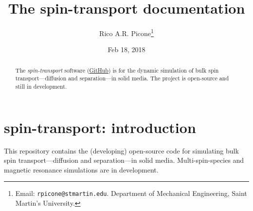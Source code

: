 \documentclass[%
oneside,                 %
final,                   %
10pt]{article}
\let\oldtoc\tableofcontents
\renewcommand{\tableofcontents}{{\sffamily\oldtoc}}
\begin{document}

\newcommand{\exercisesection}[1]{\subsection*{#1}}







\title{\sffamily\bfseries{}The spin-transport documentation}


\author{\sffamily{}Rico A.R. Picone\footnote{Email: \texttt{rpicone@stmartin.edu}. Department of Mechanical Engineering, Saint Martin's University.}}


\date{\sffamily{}Feb 18, 2018}
\maketitle

\begin{abstract}
The \emph{spin-transport} software (\href{{https://github.com/ricopicone/spin-transport}}{GitHub}) is for the dynamic simulation of bulk spin transport---diffusion and separation---in solid media.
The project is open-source and still in development.
\end{abstract}

\tableofcontents


\vspace{1cm} %






\section{spin-transport: introduction}

This repository contains the (developing) open-source code for simulating bulk spin transport---diffusion and separation---in solid media. Multi-spin-species and magnetic resonance simulations are in development.
\end{document}
